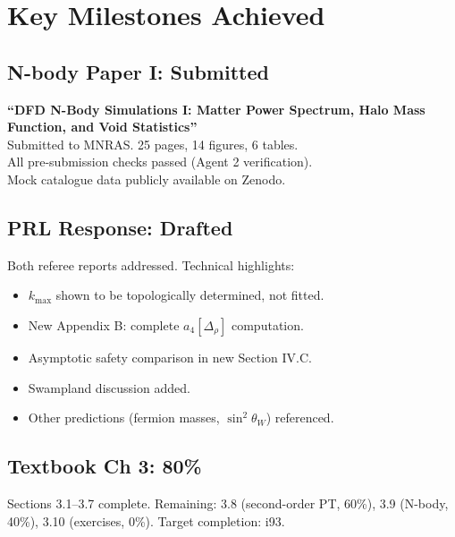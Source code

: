 \documentclass[11pt,a4paper]{article}
\begin{document}
\section{Key Milestones Achieved}

\subsection{N-body Paper I: Submitted}

\begin{tcolorbox}[colback=green!5!white, colframe=dfdgreen, title=\textbf{MILESTONE}]
\textbf{``DFD N-Body Simulations I: Matter Power Spectrum, Halo Mass Function, and Void Statistics''}\\
Submitted to MNRAS. 25 pages, 14 figures, 6 tables.\\
All pre-submission checks passed (Agent 2 verification).\\
Mock catalogue data publicly available on Zenodo.
\end{tcolorbox}

\subsection{PRL Response: Drafted}

Both referee reports addressed. Technical highlights:
\begin{itemize}[nosep]
\item $k_{\max}$ shown to be topologically determined, not fitted.
\item New Appendix B: complete $a_4[\Delta_\rho]$ computation.
\item Asymptotic safety comparison in new Section IV.C.
\item Swampland discussion added.
\item Other predictions (fermion masses, $\sin^2\theta_W$) referenced.
\end{itemize}

\subsection{Textbook Ch 3: 80\%}

Sections 3.1--3.7 complete. Remaining: 3.8 (second-order PT, 60\%), 3.9 (N-body, 40\%), 3.10 (exercises, 0\%). Target completion: i93.

\end{document}
